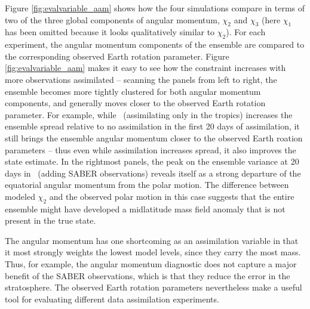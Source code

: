 Figure \ref{fig:evalvariable_aam} shows how the four simulations compare in terms of two of the three global components of angular momentum, $\chi_2$ and $\chi_3$ (here $\chi_1$ has been omitted because it looks qualitatively similar to $\chi_2$).  
For each experiment, the angular momentum components of the ensemble are compared  to the corresponding observed Earth rotation parameter. 
Figure  \ref{fig:evalvariable_aam} makes it easy to see how the constraint increases with more observations assimilated -- scanning the panels from left to right, the ensemble becomes more tightly clustered for both angular momentum components, and generally moves closer to the observed Earth rotation parameter. 
For example, while \WACCMTROPICS~(assimilating only in the tropics) increases the ensemble spread relative to no assimilation in the first 20 days of assimilation, it still brings the ensemble angular momentum closer to the observed Earth roation parameters -- thus even while assimilation increases spread, it also improves the state estimate. 
In the rightmost panels, the peak on the ensemble variance at 20 days in \NCARFULL~(adding SABER observations) reveals itself as a strong departure of the equatorial angular momentum from the polar motion.   
The difference between modeled $\chi_2$ and the observed polar motion in this case suggests that the entire ensemble might have developed a midlatitude mass field anomaly that is not present in the true state. 

The angular momentum has one shortcoming as an assimilation variable in that it most strongly weights the lowest model levels, since they carry the most mass. 
Thus, for example, the angular momentum diagnostic does not capture a major benefit of the SABER observations, which is that they reduce the error in the stratosphere. 
The observed Earth rotation parameters nevertheless make a useful tool for evaluating different data assimilation experiments. 
